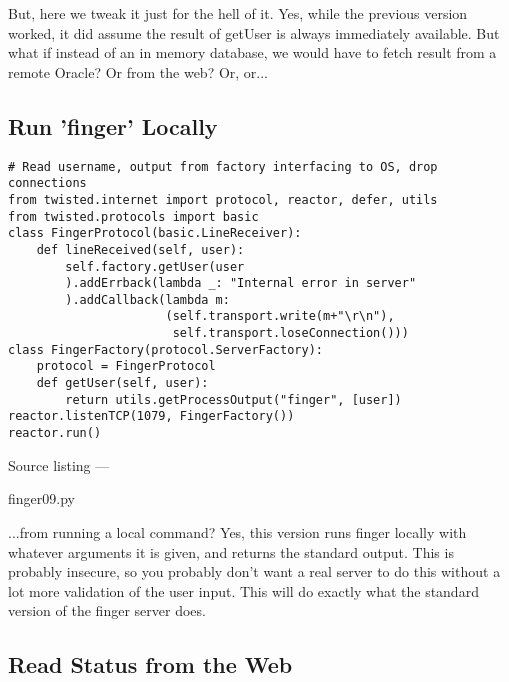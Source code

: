 But, here we tweak it just for the hell of it. Yes, while the previous version worked, it did assume the result of getUser is always immediately available. But what if instead of an in memory database, we would have to fetch result from a remote Oracle? Or from the web? Or, or...

\subsection{Run 'finger' Locally}
\begin{verbatim}
# Read username, output from factory interfacing to OS, drop connections
from twisted.internet import protocol, reactor, defer, utils
from twisted.protocols import basic
class FingerProtocol(basic.LineReceiver):
    def lineReceived(self, user):
        self.factory.getUser(user
        ).addErrback(lambda _: "Internal error in server"
        ).addCallback(lambda m:
                      (self.transport.write(m+"\r\n"),
                       self.transport.loseConnection()))
class FingerFactory(protocol.ServerFactory):
    protocol = FingerProtocol
    def getUser(self, user):
        return utils.getProcessOutput("finger", [user])
reactor.listenTCP(1079, FingerFactory())
reactor.run()
\end{verbatim}\parbox[b]{\linewidth}{\begin{center}Source listing --- \begin{em}finger09.py\end{em}\end{center}}

...from running a local command? Yes, this version runs finger locally with whatever arguments it is given, and returns the standard output. This is probably insecure, so you probably don't want a real server to do this without a lot more validation of the user input. This will do exactly what the standard version of the finger server does.

\subsection{Read Status from the Web}


